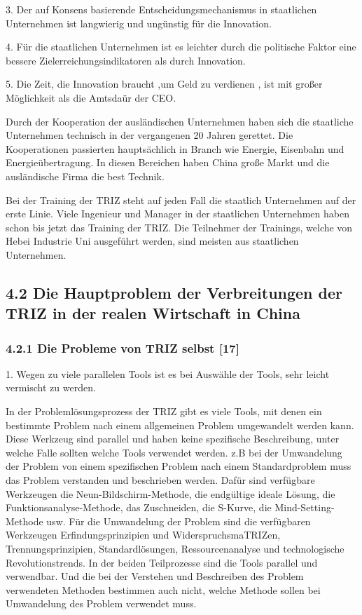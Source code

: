 \documentclass[11pt,a4paper]{article}
\begin{document}
3. Der auf Konsens basierende Entscheidungsmechanismus in staatlichen
Unternehmen ist langwierig und ungünstig für die Innovation.

4.  Für die staatlichen Unternehmen ist es leichter durch die politische
Faktor eine bessere Zielerreichungsindikatoren als durch Innovation.

5. Die Zeit, die Innovation braucht ,um Geld zu  verdienen , ist  mit großer
Möglichkeit als die Amtsdaür der CEO.

Durch der Kooperation der ausländischen Unternehmen haben sich die staatliche
Unternehmen technisch in der vergangenen 20 Jahren gerettet.  Die
Kooperationen passierten hauptsächlich in Branch wie Energie, Eisenbahn und
Energieübertragung. In diesen Bereichen haben China große Markt und die
ausländische Firma die best Technik.

Bei der Training der TRIZ steht auf jeden Fall die staatlich Unternehmen auf
der erste Linie. Viele Ingenieur und Manager in der staatlichen Unternehmen
haben schon bis jetzt das Training der TRIZ. Die Teilnehmer der Trainings,
welche von Hebei Industrie Uni ausgeführt werden, sind meisten aus staatlichen
Unternehmen. 

\subsection{4.2  Die Hauptproblem der Verbreitungen der TRIZ in der realen
  Wirtschaft in China}

\subsubsection{4.2.1 Die Probleme von TRIZ selbst [17]}

1. Wegen zu viele parallelen Tools ist es bei Auswähle der Tools, sehr leicht
vermischt zu werden.

In der Problemlösungsprozess der TRIZ gibt es viele Tools, mit denen ein
bestimmte Problem nach einem allgemeinen Problem umgewandelt werden
kann. Diese Werkzeug sind parallel und haben keine spezifische Beschreibung,
unter welche Falle sollten welche Tools verwendet werden. z.B bei der
Umwandelung der Problem von einem spezifischen Problem nach einem
Standardproblem muss das Problem verstanden und beschrieben werden. Dafür sind
verfügbare Werkzeugen die Neun-Bildschirm-Methode, die endgültige ideale
Lösung, die Funktionsanalyse-Methode, das Zuschneiden, die S-Kurve, die
Mind-Setting-Methode usw. Für die Umwandelung der Problem sind die verfügbaren
Werkzeugen Erfindungsprinzipien und WiderspruchsmaTRIZen, Trennungsprinzipien,
Standardlösungen, Ressourcenanalyse und technologische Revolutionstrends. In
der beiden Teilprozesse sind die Tools parallel und verwendbar. Und die bei
der Verstehen und Beschreiben des Problem verwendeten Methoden bestimmen auch
nicht, welche Methode sollen bei Umwandelung des Problem verwendet muss.
\end{document}
